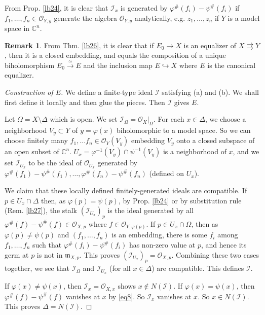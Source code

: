 \documentclass[12pt,b5paper,notitlepage]{report}
\theoremstyle{definition}
\newtheorem{rem}[df]{Remark}
\theoremstyle{plain}
\newcommand{\fk}{\mathfrak}
\newcommand{\mc}{\mathcal}
\newcommand{\scr}{\mathscr}
\newcommand{\Cbb}{\mathbb C}
\numberwithin{equation}{section}
\begin{document}
From Prop. \ref{lb24}, it is clear that $\mc I_x$ is generated by $\varphi^\#(f_i)-\psi^\#(f_i)$ if $f_1,\dots,f_n\in\scr O_{Y,y}$ generate the algebra $\scr O_{Y,y}$ analytically, e.g. $z_1,\dots,z_n$ if $Y$ is a model space in $\Cbb^n$.

\begin{rem}\label{lb42}
From Thm. \ref{lb26}, it is clear that if $E_0\rightarrow X$ is an equalizer of $X\rightrightarrows Y$, then it is a closed embedding, and equals the composition of a unique biholomorphism $E_0\xrightarrow{\simeq} E$ and the inclusion map $E\hookrightarrow X$ where $E$ is the canonical equalizer.
\end{rem}



\begin{proof}[Construction of $E$]
We define a finite-type ideal $\mc I$ satisfying (a) and (b). We shall first define it locally and then glue the pieces. Then $\mc I$ gives $E$.

Let $\Omega=X\setminus \Delta$ which is open.  We set $\mc I_\Omega=\scr O_X|_\Omega$. For each $x\in \Delta$, we choose a neighborhood $V_y\subset Y$ of $y=\varphi(x)$ biholomorphic to a model space. So we can choose finitely many $f_1,\dots f_n\in\scr O_Y(V_y)$ embedding $V_y$ onto a closed subspace of an open subset of $\Cbb^n$. $U_x=\varphi^{-1}(V_y)\cap \psi^{-1}(V_y)$ is a neighborhood of $x$, and we set $\mc I_{U_x}$ to be the ideal of $\scr O_{U_x}$ generated by $\varphi^\#(f_1)-\psi^\#(f_1),\dots,\varphi^\#(f_n)-\psi^\#(f_n)$ (defined on $U_x$).

We claim that these locally defined finitely-generated ideals are compatible. If $p\in U_x\cap \Delta$ then, as $\varphi(p)=\psi(p)$, by Prop. \ref{lb24} or by substitution rule (Rem. \ref{lb27}), the stalk $(\mc I_{U_x})_p$ is the ideal generated by all $\varphi^\#(f)-\psi^\#(f)\in\scr O_{X,p}$ where $f\in\scr O_{Y,\varphi(p)}$. If $p\in U_x\cap\Omega$, then as $\varphi(p)\neq\psi(p)$ and $(f_1,\dots,f_n)$ is an embedding, there is some $f_i$ among $f_1,\dots,f_n$ such that $\varphi^\#(f_i)-\psi^\#(f_i)$ has non-zero value at $p$, and hence its germ at $p$ is not in $\fk m_{X,p}$. This proves $(\mc I_{U_x})_p=\scr O_{X,p}$. Combining these two cases together, we see that $\mc I_\Omega$ and $\mc I_{U_x}$ (for all $x\in\Delta$) are compatible. This defines $\mc I$.

If $\varphi(x)\neq\psi(x)$, then $\mc I_x=\scr O_{X,x}$ shows $x\notin N(\mc I)$. If $\varphi(x)=\psi(x)$, then $\varphi^\#(f)-\psi^\#(f)$ vanishes at $x$ by \eqref{eq8}. So $\mc I_x$ vanishes at $x$. So $x\in N(\mc I)$. This proves $\Delta=N(\mc I)$.
\end{proof}
\end{document}
